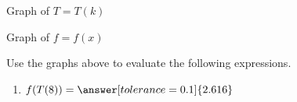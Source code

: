 \documentclass{ximera}
\begin{document}
Graph of $T=T(k)$

\begin{center}
\end{center}






Graph of $f=f(x)$

\begin{center}
\end{center}




\begin{question}


Use the graphs above to evaluate the following expressions.



\begin{enumerate}

\item $f(T(8)) = \answer[tolerance=0.1]{2.616}$ \\


\end{enumerate}








\end{question}
\end{document}
